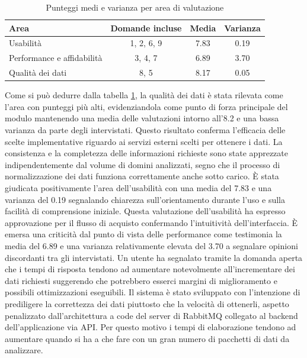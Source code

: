 \documentclass[target=bach,aauheader=,style=]{thud}
\begin{document}
\begin{table}[h]
\centering
\caption{Punteggi medi e varianza per area di valutazione}
\label{tab:questionnaire_results_areas}
    \begin{tabular}{|p{5cm}|c|c|c|}
    \hline
    \textbf{Area} & \textbf{Domande incluse} & \textbf{Media} & \textbf{Varianza} \\
    \hline
    Usabilità & 1, 2, 6, 9 & 7.83 & 0.19 \\
    \hline
    Performance e affidabilità & 3, 4, 7 & 6.89 & 3.70 \\
    \hline
    Qualità dei dati & 8, 5 & 8.17 & 0.05 \\
    \hline
    \end{tabular}
\end{table}

Come si può dedurre dalla tabella \ref{tab:questionnaire_results_areas}, la qualità dei dati è stata rilevata come l'area con punteggi più alti, evidenziandola come punto di forza principale del modulo
mantenendo una media delle valutazioni intorno all'8.2 e una bassa varianza da parte degli intervistati.
Questo risultato conferma l'efficacia delle scelte implementative riguardo ai servizi esterni scelti per ottenere i dati. La consistenza e la completezza delle informazioni richieste sono state
apprezzate indipendentemente dal volume di domini analizzati, segno che il processo di normalizzazione dei dati funziona correttamente anche sotto carico.
È stata giudicata positivamente l'area dell'usabilità con una media del 7.83 e una varianza del 0.19 segnalando chiarezza sull'orientamento durante l'uso e sulla facilità di comprensione iniziale.
Questa valutazione dell'usabilità ha espresso approvazione per il flusso di acquisto confermando l'intuitività dell'interfaccia.
È emersa una criticità dal punto di vista delle performance come testimonia la media del 6.89 e una varianza relativamente elevata del 3.70 a segnalare opinioni discordanti tra gli intervistati.
Un utente ha segnalato tramite la domanda aperta che i tempi di risposta tendono ad aumentare notevolmente all'incrementare dei dati richiesti suggerendo che potrebbero esserci margini di miglioramento
e possibili ottimizzazioni eseguibili.
Il sistema è stato sviluppato con l'intenzione di prediligere la correttezza dei dati piuttosto che la velocità di ottenerli, aspetto penalizzato dall'architettura a code del server di
RabbitMQ collegato al backend dell'applicazione via API. Per questo motivo i tempi di elaborazione tendono ad aumentare quando si ha a che fare con un gran numero di pacchetti di dati da analizzare.
\end{document}
